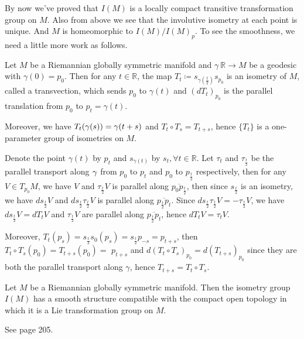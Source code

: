 	By now we've proved that $I(M)$ is a locally compact
	transitive transformation group on $M$. Also from above we
	see that the involutive isometry at each point is unique. And
	$M$ is homeomorphic to $I(M) / I(M)_p$. To see the
	smoothness, we need a little more work as follows.


\begin{lemma}\label{3.7}
Let $M$ be a Riemannian globally symmetric manifold and $\gamma\:
\mathbb{R} \rightarrow M$ be a geodesic with $\gamma(0) = p_{0}
.$ Then for any $t \in \mathbb{R}$, the map $T_{t} \coloneq
s_{\gamma\left( \frac{t}{2} \right)} s_{p_{0}}$ is an isometry of
$M$, called a transvection, which sends $p_{0}$ to $\gamma(t)$
and $\left( d T_{t} \right)_{p_{0}}$ is the parallel translation
from $p_{0}$ to $p_{t} = \gamma(t)$.

Moreover, we have $T_t(\gamma(s)) = \gamma(t+s)$ and $T_t\circ T_s =
T_{t+s}$, hence $\{ T_t \}$ is a one-parameter group of
isometries on $M$.	
\end{lemma}
\bproof
Denote the point $\gamma(t)$ by $p_{t}$ and $s_{\gamma(t)}$ by
$s_{t}, \forall t \in \mathbb{R} .$ Let $\tau_{t}$ and
$\tau_{\frac{t}{2}}$ be the parallel transport along $\gamma $ from
$p_{0}$ to $p_{t}$ and $p_{0}$ to $p_{\frac{t}{2}}$ respectively,
then for any $V \in T_{p_{0}} M$, we have $V$ and
$\tau_{\frac{t}{2}} V$ is parallel along $\overline{p_{0}
p_{\frac{t}{2}}}$, then since $s_{\frac{t}{2}}$ is an isometry,
we have $d s_{\frac{t}{2}} V$ and $d s_{\frac{t}{2}}
\tau_{\frac{t}{2}} V$ is parallel along
$\overline{p_{\frac{t}{2}} p_{t}} .$ Since $d s_{\frac{t}{2}}
\tau_{\frac{t}{2}} V=-\tau_{\frac{t}{2}} V$, we have
$d s_{\frac{t}{2}} V=d T_{t} V$ and $\tau_{\frac{t}{2}} V$ are
parallel along $\overline{p_{\frac{t}{2}} p_{t}}$, hence $d T_{t}
V=\tau_{t} V .$

Moreover, $T_{t}\left( p_{s} \right)=s_{\frac{t}{2}} s_{0}\left(
p_{s} \right)=s_{\frac{t}{2}} p_{-s}=p_{t+s}$, then $T_{t} \circ
T_{s}\left( p_{0} \right)=T_{t+s}\left( p_{0} \right)=$
$p_{t+s}$ and $d\left( T_{t} \circ T_{s} \right)_{p_{0}}=d\left(
T_{t+s} \right)_{p_{0}}$ since they are both the parallel
transport along $\gamma$, hence $T_{t+s}=T_{t} \circ T_{s}$.
\eproof
\begin{theorem}
	Let $M$ be a Riemannian globally symmetric manifold. Then the
	isometry group $I(M)$ has a smooth structure compatible with
	the compact open topology in which it is a Lie transformation
	group on $M$.
\end{theorem}
\bproof
See \cite{Hel} page 205.
\eproof



